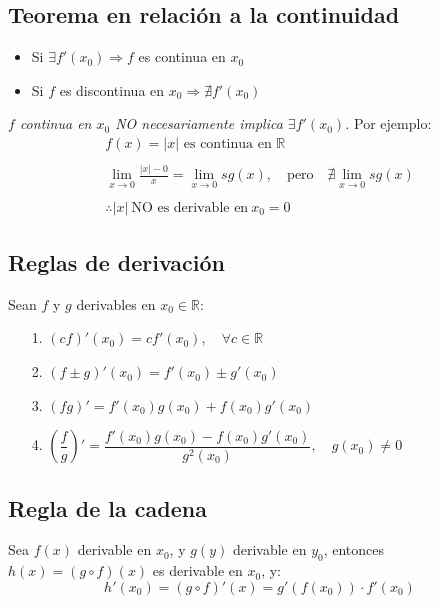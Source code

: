 \documentclass[11pt,titlepage]{article}
\newcommand{\commLim}[2]{\lim_{#1 \to #2}}
\begin{document}
\subsection{Teorema en relación a la continuidad}
\begin{itemize}
	\item Si $\exists f'(x_0) \Rightarrow f$ es continua en $x_0$
	\item Si $f$ es discontinua en $x_0 \Rightarrow \nexists f'(x_0)$
\end{itemize}
\emph{$f$ continua en $x_0$ NO necesariamente implica $\exists f'(x_0)$.} Por ejemplo:
\begin{gather*}
	f(x) = |x| \text{ es continua en } \mathbb{R} \\ \\
	\commLim{x}{0} \frac{|x| - 0}{x} = \commLim{x}{0} sg(x), \quad \text{pero} \quad \nexists \commLim{x}{0} sg(x) \\ \\
	\therefore |x| \ \text{NO es derivable en} \ x_0 = 0
\end{gather*}

\subsection{Reglas de derivación}
Sean $f$ y $g$ derivables en $x_0 \in \mathbb{R}$:
\begin{itemize}
	\item[1.] $(cf)'(x_0) = cf'(x_0), \quad \forall c \in \mathbb{R}$
	\item[2.] $(f \pm g)'(x_0) = f'(x_0) \pm g'(x_0)$ 
	\item[3.] $(fg)' = f'(x_0)g(x_0) + f(x_0)g'(x_0)$
	\item[4.] $\left(\dfrac{f}{g}\right)' = \dfrac{f'(x_0)g(x_0) - f(x_0)g'(x_0)}{g^{2}(x_0)}, \quad g(x_0) \neq 0$
\end{itemize}

\subsection{Regla de la cadena}
Sea $f(x)$ derivable en $x_0$, y $g(y)$ derivable en $y_0$, entonces $h(x) = (g \circ f)(x)$ es derivable en $x_0$, y:
\begin{equation}
	h'(x_0) = (g \circ f)'(x) = g'\left(f(x_0)\right) \cdot f'(x_0)
\end{equation}
\end{document}
